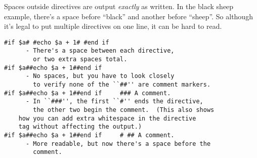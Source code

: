 Spaces outside directives are output {\em exactly} as written.  In the 
black sheep example, there's a space before ``black'' and another before
``sheep''.  So although it's legal to put multiple directives on one line,
it can be hard to read.

\begin{verbatim}
#if $a# #echo $a + 1# #end if
      - There's a space between each directive, 
        or two extra spaces total.
#if $a##echo $a + 1##end if
      - No spaces, but you have to look closely
        to verify none of the ``##'' are comment markers.
#if $a##echo $a + 1##end if     ### A comment.
      - In ``###'', the first ``#'' ends the directive, 
        the other two begin the comment.  (This also shows
	how you can add extra whitespace in the directive
	tag without affecting the output.)
#if $a##echo $a + 1##end if     # ## A comment.
      - More readable, but now there's a space before the
        comment.
\end{verbatim}


